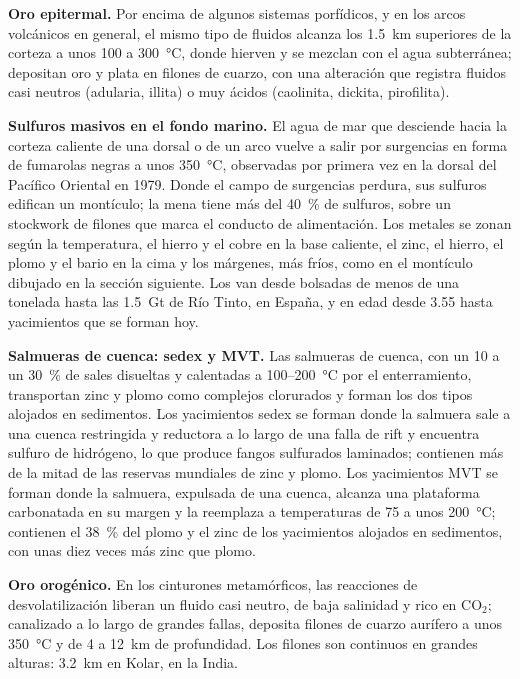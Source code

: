 \textbf{Oro epitermal.} Por encima de algunos sistemas porfídicos, y en los arcos volcánicos en general, el mismo
tipo de fluidos alcanza los \qty{1.5}{km} superiores de la corteza a unos 100 a \qty{300}{\celsius},
donde hierven y se mezclan con el agua subterránea; depositan oro y plata en filones de cuarzo, con una
alteración que registra fluidos casi neutros (adularia, illita) o muy ácidos (caolinita,
dickita, pirofilita).

\textbf{Sulfuros masivos en el fondo marino.} El agua de mar que desciende hacia la corteza caliente de una dorsal o de
un arco vuelve a salir por surgencias en forma de fumarolas negras a unos \qty{350}{\celsius}, observadas por primera vez en la dorsal del
Pacífico Oriental en 1979. Donde el campo de surgencias perdura, sus sulfuros edifican un montículo; la mena tiene más del
\qty{40}{\percent} de sulfuros, sobre un stockwork de filones que marca el conducto de alimentación. Los metales se zonan
según la temperatura, el hierro y el cobre en la base caliente, el zinc, el hierro, el plomo y el bario en la cima y los
márgenes, más fríos, como en el montículo dibujado en la sección siguiente. Los 
van desde bolsadas de menos de una tonelada hasta las \qty{1.5}{Gt} de Río Tinto, en España, y en
edad desde \qty{3.55}{\Ga} hasta yacimientos que se forman hoy.

\textbf{Salmueras de cuenca: sedex y MVT.} Las salmueras de cuenca, con un 10 a un \qty{30}{\percent} de sales disueltas y
calentadas a 100--\qty{200}{\celsius} por el enterramiento, transportan zinc y plomo como complejos clorurados y forman los
dos tipos alojados en sedimentos. Los yacimientos sedex se forman donde la salmuera sale a una cuenca restringida y reductora
a lo largo de una falla de rift y encuentra sulfuro de hidrógeno, lo que produce fangos sulfurados laminados; contienen más
de la mitad de las reservas mundiales de zinc y plomo. Los yacimientos MVT se forman donde la salmuera, expulsada de una
cuenca, alcanza una plataforma carbonatada en su margen y la reemplaza a temperaturas de 75 a unos
\qty{200}{\celsius}; contienen el \qty{38}{\percent} del plomo y el zinc de los yacimientos alojados en sedimentos,
con unas diez veces más zinc que plomo.

\textbf{Oro orogénico.} En los cinturones metamórficos, las reacciones de desvolatilización liberan un fluido casi neutro,
de baja salinidad y rico en CO$_2$; canalizado a lo largo de grandes fallas, deposita filones de cuarzo aurífero
a unos \qty{350}{\celsius} y de 4 a \qty{12}{km} de profundidad. Los filones son continuos en
grandes alturas: \qty{3.2}{km} en Kolar, en la India.

